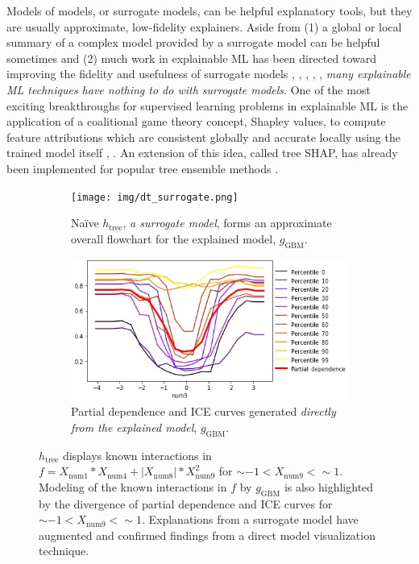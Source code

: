 \documentclass{article}
\begin{document}
Models of models, or surrogate models, can be helpful explanatory tools, but they are usually approximate, low-fidelity explainers. Aside from (1) a global or local summary of a complex model provided by a surrogate model can be helpful sometimes and (2) much work in explainable ML has been directed toward improving the fidelity and usefulness of surrogate models \cite{dt_surrogate2}, \cite{viper}, \cite{dt_surrogate1}, \cite{lime-sup}, \cite{wf_xnn}, \textit{many explainable ML techniques have nothing to do with surrogate models}. One of the most exciting breakthroughs for supervised learning problems in explainable ML is the application of a coalitional game theory concept, Shapley values, to compute feature attributions which are consistent globally and accurate locally using the trained model itself \cite{shapley}, \cite{kononenko2010efficient}. An extension of this idea, called tree SHAP, has already been implemented for popular tree ensemble methods \cite{tree_shap}. 

\begin{figure}[htb!]
	\begin{subfigure}{.55\textwidth}
		\texttt{[image: img/dt\_surrogate.png]}
  		\caption{Na\"ive $h_{\text{tree}}$, \textit{a surrogate model}, forms an approximate overall flowchart for the explained model, $g_{\text{GBM}}$.}
  		\label{fig:dt_surrogate}
	\end{subfigure}\hspace{5pt}
	\begin{subfigure}{.45\textwidth}
  		\includegraphics[height=.52\linewidth, width=1.02\linewidth]{img/pdp_ice.png}
  		\caption{Partial dependence and ICE curves generated \textit{directly from the explained model}, $g_{\text{GBM}}$.}
  		\label{fig:pdp_ice}
	\end{subfigure}
	\caption{$h_{\text{tree}}$ displays known interactions in $f = X_{\text{num}1} * X_{\text{num}4} + |X_{\text{num}8}| * X_{\text{num}9}^2$ for $\sim -1 < X_{\text{num9}} <  \sim 1$. Modeling of the known interactions in $f$ by $g_{\text{GBM}}$ is also highlighted by the divergence of partial dependence and ICE curves for $\sim -1 < X_{\text{num9}} <  \sim 1$. Explanations from a surrogate model have augmented and confirmed findings from a direct model visualization technique.}
	\label{fig:pdp_ice_dt_surrogate}
\end{figure}
\end{document}
